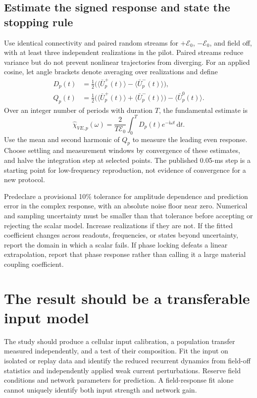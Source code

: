 \documentclass[11pt,a4paper]{article}
\newcommand{\ii}{\mathrm i}
\newcommand{\dd}{\mathrm d}
\newcommand{\E}{\mathcal E}
\begin{document}
\subsection{Estimate the signed response and state the stopping rule}

Use identical connectivity and paired random streams for $+\E_0$, $-\E_0$, and field off, with at least three independent realizations in the pilot. Paired streams reduce variance but do not prevent nonlinear trajectories from diverging. For an applied cosine, let angle brackets denote averaging over realizations and define
\begin{align}
D_p(t)&=\tfrac12\big(\langle\bar U_p^+(t)\rangle-
\langle\bar U_p^-(t)\rangle\big),\\
Q_p(t)&=\tfrac12\big(\langle\bar U_p^+(t)\rangle+
\langle\bar U_p^-(t)\rangle\big)-\langle\bar U_p^0(t)\rangle.
\end{align}
Over an integer number of periods with duration $T$, the fundamental estimate is
\begin{equation}
\widehat\chi_{VE,p}(\omega)=\frac{2}{T\E_0}
\int_0^T D_p(t)e^{-\ii\omega t}\,\dd t.
\label{eq:estimator}
\end{equation}
Use the mean and second harmonic of $Q_p$ to measure the leading even response. Choose settling and measurement windows by convergence of these estimates, and halve the integration step at selected points. The published 0.05-ms step is a starting point for low-frequency reproduction, not evidence of convergence for a new protocol.

Predeclare a provisional 10\% tolerance for amplitude dependence and prediction error in the complex response, with an absolute noise floor near zero. Numerical and sampling uncertainty must be smaller than that tolerance before accepting or rejecting the scalar model. Increase realizations if they are not. If the fitted coefficient changes across readouts, frequencies, or states beyond uncertainty, report the domain in which a scalar fails. If phase locking defeats a linear extrapolation, report that phase response rather than calling it a large material coupling coefficient.

\section{The result should be a transferable input model}

The study should produce a cellular input calibration, a population transfer measured independently, and a test of their composition. Fit the input on isolated or replay data and identify the reduced recurrent dynamics from field-off statistics and independently applied weak current perturbations. Reserve field conditions and network parameters for prediction. A field-response fit alone cannot uniquely identify both input strength and network gain.
\end{document}
